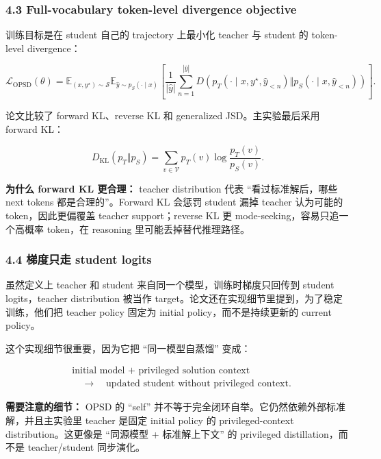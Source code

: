 \subsubsection{4.3 Full-vocabulary token-level divergence objective}

训练目标是在 student 自己的 trajectory 上最小化 teacher 与 student 的 token-level divergence：

\[
\mathcal{L}_{\mathrm{OPSD}}(\theta)
=
\mathbb{E}_{(x,y^\star)\sim\mathcal{S}}
\mathbb{E}_{\hat{y}\sim p_S(\cdot\mid x)}
\left[
\frac{1}{|\hat{y}|}
\sum_{n=1}^{|\hat{y}|}
D\!\left(
 p_T(\cdot\mid x,y^\star,\hat{y}_{<n})
 \Vert
 p_S(\cdot\mid x,\hat{y}_{<n})
\right)
\right].
\]

论文比较了 forward KL、reverse KL 和 generalized JSD。主实验最后采用 forward KL：

\[
D_{\mathrm{KL}}(p_T\Vert p_S)
=
\sum_{v\in\mathcal{V}}
 p_T(v)\log\frac{p_T(v)}{p_S(v)}.
\]

\begin{summarybox}
\textbf{为什么 forward KL 更合理：} teacher distribution 代表 ``看过标准解后，哪些 next tokens 都是合理的''。Forward KL 会惩罚 student 漏掉 teacher 认为可能的 token，因此更偏覆盖 teacher support；reverse KL 更 mode-seeking，容易只追一个高概率 token，在 reasoning 里可能丢掉替代推理路径。
\end{summarybox}

\subsubsection{4.4 梯度只走 student logits}

虽然定义上 teacher 和 student 来自同一个模型，训练时梯度只回传到 student logits，teacher distribution 被当作 target。论文还在实现细节里提到，为了稳定训练，他们把 teacher policy 固定为 initial policy，而不是持续更新的 current policy。

这个实现细节很重要，因为它把 ``同一模型自蒸馏'' 变成：

\[
\begin{aligned}
&\text{initial model + privileged solution context}\\
&\quad\longrightarrow\quad
\text{updated student without privileged context}.
\end{aligned}
\]

\begin{warnbox}
\textbf{需要注意的细节：} OPSD 的 ``self'' 并不等于完全闭环自举。它仍然依赖外部标准解，并且主实验里 teacher 是固定 initial policy 的 privileged-context distribution。这更像是 ``同源模型 + 标准解上下文'' 的 privileged distillation，而不是 teacher/student 同步演化。
\end{warnbox}

